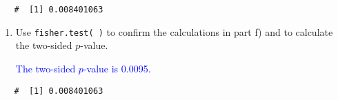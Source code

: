 \documentclass[letterpaper,12pt,twoside,]{pinp}
\begin{document}
\begin{enumerate}
\begin{Shaded}
\begin{Highlighting}[]
\NormalTok{(}\NormalTok{, }\NormalTok{, } \OperatorTok{-}\StringTok{ }\NormalTok{, }\NormalTok{, } \NormalTok{)}
\end{Highlighting}
\end{Shaded}

  \begin{ShadedResult}
   \begin{verbatim}
   #  [1] 0.008401063
   \end{verbatim}
   \end{ShadedResult}

  \begin{enumerate}
  \def\labelenumii{\alph{enumii})}
  \setcounter{enumii}{6}
  \item
    Use \texttt{fisher.test( )} to confirm the calculations in part f)
    and to calculate the two-sided \(p\)-value.

    \textcolor{blue}{The two-sided $p$-value is 0.0095.}
  \end{enumerate}

\begin{Shaded}
\begin{Highlighting}[]
 \NormalTok{)}\OperatorTok{$}
\end{Highlighting}
\end{Shaded}

  \begin{ShadedResult}
   \begin{verbatim}
   #  [1] 0.008401063
   \end{verbatim}
   \end{ShadedResult}

\begin{Shaded}
\begin{Highlighting}[]
 \NormalTok{)}\OperatorTok{$}
\end{Highlighting}
\end{Shaded}


\end{enumerate}
\end{document}
